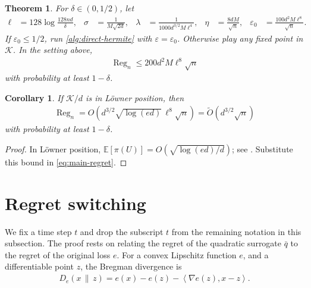 \documentclass{article}
\newtheorem{theorem}{Theorem}
\newtheorem{corollary}[corollary]{Corollary}
\newcommand{\E}{\mathbb E}
\newcommand{\K}{\mathcal K}
\newcommand{\1}{\mathbf 1}
\newcommand{\eps}{\varepsilon}
\newcommand{\ip}[2]{\left\langle #1,#2\right\rangle}
\begin{document}
\begin{theorem}
    \label{thm:main}
    For $\delta\in(0,1/2)$, let
    \begin{align}
        \ell    & =128\log\frac{128nd}{\delta},
                &
        \sigma  & =\frac1{M\sqrt{2d}},
                &
        \lambda & =\frac{1}{1000d^{3/2}M\ell^4},
                &
        \eta    & =\frac{8dM}{\sqrt n},
                &
        \eps_0  & =\frac{100d^2M\ell^8}{\sqrt n}.
        \label{eq:parameters-one}
        \label{eq:parameters-two}
    \end{align}
    If $\eps_0\leq1/2$, run \cref{alg:direct-hermite} with $\eps=\eps_0$.
    Otherwise play any fixed point in $\K$.  In the setting above,
    \begin{align}
        \operatorname{Reg}_n
        \leq 200d^2M\ell^8\sqrt n
        \label{eq:main-regret}
    \end{align}
    with probability at least $1-\delta$.
\end{theorem}

\begin{corollary}
    \label{cor:loewner}
    If $\K/d$ is in L\"owner position, then
    \begin{align}
        \operatorname{Reg}_n
        =O\!\left(
        d^{3/2}\sqrt{\log(ed)}\,\ell^8\sqrt n
        \right)
        =\widetilde O(d^{3/2}\sqrt n)
    \end{align}
    with probability at least $1-\delta$.
\end{corollary}

\begin{proof}
    In L\"owner position,
    $\E[\pi(U)]=O(\sqrt{\log(ed)/d})$; see
    \citet[Table~10.1(a)]{lattimore2026bandit}.  Substitute this bound in
    \eqref{eq:main-regret}.
\end{proof}

\section{Regret switching}
\label{sec:analysis}
We fix a time step $t$ and drop the subscript $t$ from the remaining notation in this subsection.
The proof rests on relating the regret of the quadratic surrogate $\bar{q}$ to the regret of the original loss $e$.
For a convex Lipschitz function $e$, and a differentiable point $z$, the Bregman divergence is
\begin{align}
    D_e(x\,\|\,z)
    =e(x)-e(z)-\ip{\nabla e(z)}{x-z}.
    \label{eq:bregman}
\end{align}
\end{document}
